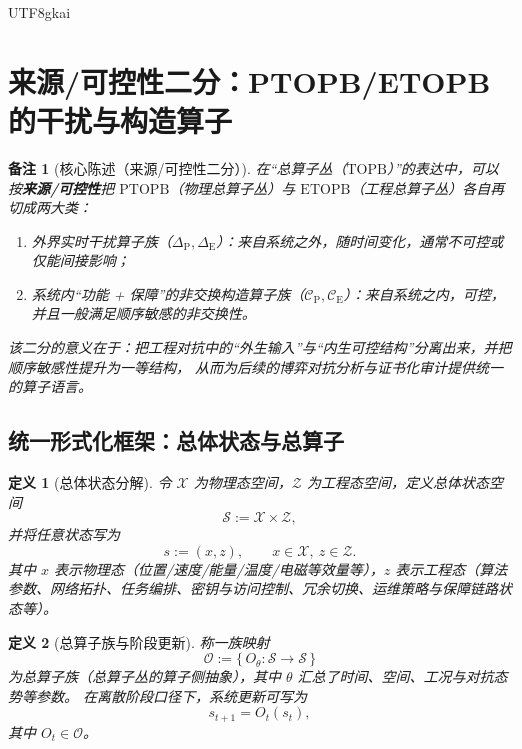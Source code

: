 \documentclass[12pt]{article}
\newtheorem{definition}{定义}[section]
\newtheorem{remark}{备注}[section]
\newcommand{\PTOPB}{\ensuremath{\mathrm{PTOPB}}}
\newcommand{\ETOPB}{\ensuremath{\mathrm{ETOPB}}}
\newcommand{\TOPB}{\ensuremath{\mathrm{TOPB}}}
\begin{document}
\begin{CJK*}{UTF8}{gkai}
\section{来源/可控性二分：PTOPB/ETOPB 的干扰与构造算子}
\label{sec:ptopb-etopb-operator-decomposition}

\begin{remark}[核心陈述（来源/可控性二分）]
在“总算子丛（\TOPB）”的表达中，可以按\textbf{来源/可控性}把 \PTOPB{}（物理总算子丛）与 \ETOPB{}（工程总算子丛）各自再切成两大类：
\begin{enumerate}
  \item 外界实时干扰算子族（$\Delta_{\mathrm{P}},\Delta_{\mathrm{E}}$）：来自系统之外，随时间变化，通常不可控或仅能间接影响；
  \item 系统内“功能 + 保障”的非交换构造算子族（$\mathcal{C}_{\mathrm{P}},\mathcal{C}_{\mathrm{E}}$）：来自系统之内，可控，并且一般满足顺序敏感的非交换性。
\end{enumerate}
该二分的意义在于：把工程对抗中的“外生输入”与“内生可控结构”分离出来，并把顺序敏感性提升为一等结构，
从而为后续的博弈对抗分析与证书化审计提供统一的算子语言。
\end{remark}

\subsection{统一形式化框架：总体状态与总算子}
\label{sec:unified-framework}

\begin{definition}[总体状态分解]
令 $\mathcal{X}$ 为物理态空间，$\mathcal{Z}$ 为工程态空间，定义总体状态空间
\[
  \mathcal{S} := \mathcal{X}\times \mathcal{Z},
\]
并将任意状态写为
\[
  s := (x,z),\qquad x\in\mathcal{X},\ z\in\mathcal{Z}.
\]
其中 $x$ 表示物理态（位置/速度/能量/温度/电磁等效量等），$z$ 表示工程态（算法参数、网络拓扑、任务编排、密钥与访问控制、冗余切换、运维策略与保障链路状态等）。
\end{definition}

\begin{definition}[总算子族与阶段更新]
称一族映射
\[
  \mathcal{O} := \{\,O_{\theta}:\mathcal{S}\to\mathcal{S}\,\}
\]
为总算子族（总算子丛的算子侧抽象），其中 $\theta$ 汇总了时间、空间、工况与对抗态势等参数。
在离散阶段口径下，系统更新可写为
\[
  s_{t+1} = O_t(s_t),
\]
其中 $O_t\in\mathcal{O}$。
\end{definition}


\end{CJK*}
\end{document}
